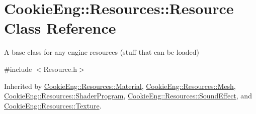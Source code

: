 \hypertarget{class_cookie_eng_1_1_resources_1_1_resource}{}\section{Cookie\+Eng\+:\+:Resources\+:\+:Resource Class Reference}
\label{class_cookie_eng_1_1_resources_1_1_resource}


A base class for any engine resources (stuff that can be loaded)  




{\ttfamily \#include $<$Resource.\+h$>$}



Inherited by \hyperlink{class_cookie_eng_1_1_resources_1_1_material}{Cookie\+Eng\+::\+Resources\+::\+Material}, \hyperlink{struct_cookie_eng_1_1_resources_1_1_mesh}{Cookie\+Eng\+::\+Resources\+::\+Mesh}, \hyperlink{class_cookie_eng_1_1_resources_1_1_shader_program}{Cookie\+Eng\+::\+Resources\+::\+Shader\+Program}, \hyperlink{class_cookie_eng_1_1_resources_1_1_sound_effect}{Cookie\+Eng\+::\+Resources\+::\+Sound\+Effect}, and \hyperlink{class_cookie_eng_1_1_resources_1_1_texture}{Cookie\+Eng\+::\+Resources\+::\+Texture}.

